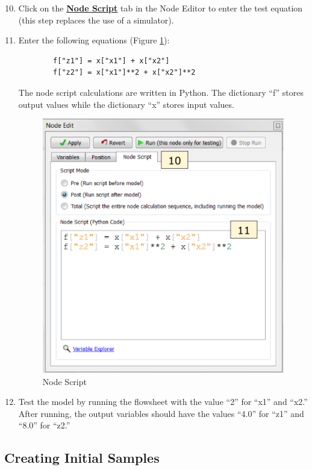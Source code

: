 \begin{enumerate}
	\setcounter{enumi}{9}
	\item Click on the \textbf{\underline{Node Script}} tab in the Node Editor to enter the test equation (this step replaces the use of a simulator).
	\item Enter the following equations (Figure \ref{fig.tut.sur.nodeEdit.eq}):
	\begin{verbatim}
		f["z1"] = x["x1"] + x["x2"]
		f["z2"] = x["x1"]**2 + x["x2"]**2
	\end{verbatim}
	The node script calculations are written in Python. The dictionary ``f'' stores output values while the dictionary ``x'' stores input values.

\begin{figure}[H]
	\begin{center}
		\includegraphics[scale=0.55]{Chapt_surrogates/figs/nodeEq}
		\caption{Node Script}
		\label{fig.tut.sur.nodeEdit.eq}
	\end{center}
\end{figure}

	\item Test the model by running the flowsheet with the value ``2'' for ``x1'' and ``x2.'' After running, the output variables should have the values ``4.0'' for ``z1'' and ``8.0'' for ``z2.''
\end{enumerate}


\subsection{Creating Initial Samples}

